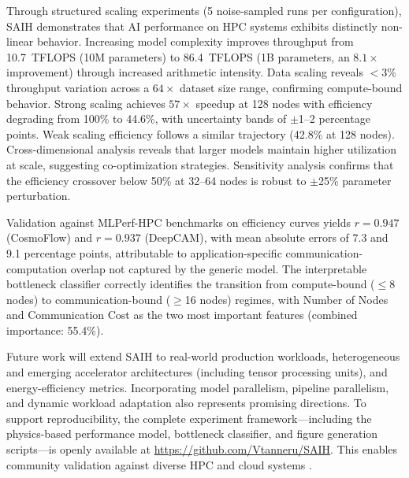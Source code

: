 \documentclass{llncs}
\begin{document}
Through structured scaling experiments (5 noise-sampled runs per configuration), SAIH demonstrates that AI performance on HPC systems exhibits distinctly non-linear behavior. Increasing model complexity improves throughput from 10.7~TFLOPS (10M parameters) to 86.4~TFLOPS (1B parameters, an $8.1\times$ improvement) through increased arithmetic intensity. Data scaling reveals $<$3\% throughput variation across a $64\times$ dataset size range, confirming compute-bound behavior. Strong scaling achieves $57\times$ speedup at 128 nodes with efficiency degrading from 100\% to 44.6\%, with uncertainty bands of $\pm$1--2 percentage points. Weak scaling efficiency follows a similar trajectory (42.8\% at 128 nodes). Cross-dimensional analysis reveals that larger models maintain higher utilization at scale, suggesting co-optimization strategies. Sensitivity analysis confirms that the efficiency crossover below 50\% at 32--64 nodes is robust to $\pm$25\% parameter perturbation.

Validation against MLPerf-HPC benchmarks on efficiency curves yields $r=0.947$ (CosmoFlow) and $r=0.937$ (DeepCAM), with mean absolute errors of 7.3 and 9.1 percentage points, attributable to application-specific communication-computation overlap not captured by the generic model. The interpretable bottleneck classifier correctly identifies the transition from compute-bound ($\leq$8 nodes) to communication-bound ($\geq$16 nodes) regimes, with Number of Nodes and Communication Cost as the two most important features (combined importance: 55.4\%).

Future work will extend SAIH to real-world production workloads, heterogeneous and emerging accelerator architectures (including tensor processing units), and energy-efficiency metrics. Incorporating model parallelism, pipeline parallelism, and dynamic workload adaptation also represents promising directions. To support reproducibility, the complete experiment framework---including the physics-based performance model, bottleneck classifier, and figure generation scripts---is openly available at \url{https://github.com/Vtanneru/SAIH}. This enables community validation against diverse HPC and cloud systems \cite{Dongarra2020, Kurth2018}.



\end{document}
